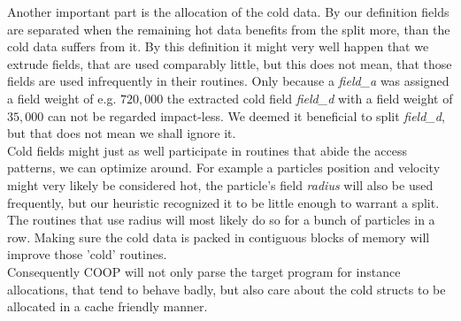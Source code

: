 Another important part is the allocation of the cold data. By our definition fields are separated when the remaining hot data benefits from the split more, than the cold data suffers from it. By this definition it might very well happen that we extrude fields, that are used comparably little, but this does not mean, that those fields are used infrequently in their routines. Only because a \textit{field\_a} was assigned a field weight of e.g. $720,000$ the extracted cold field \textit{field\_d} with a field weight of $35,000$ can not be regarded impact-less. We deemed it beneficial to split \textit{field\_d}, but that does not mean we shall ignore it.\\
Cold fields might just as well participate in routines that abide the access patterns, we can optimize around. For example a particles position and velocity might very likely be considered hot, the particle's field \textit{radius} will also be used frequently, but our heuristic recognized it to be little enough to warrant a split. The routines that use radius will most likely do so for a bunch of particles in a row. Making sure the cold data is packed in contiguous blocks of memory will improve those 'cold' routines.\\
Consequently COOP will not only parse the target program for instance allocations, that tend to behave badly, but also care about the cold structs to be allocated in a cache friendly manner.

